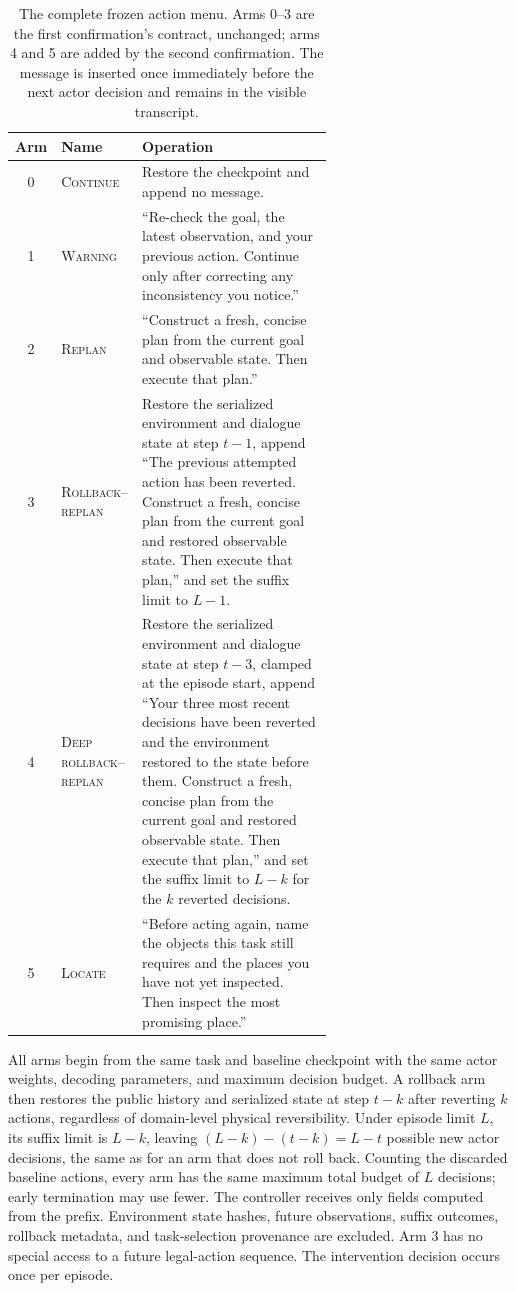 \begin{table}[ht]
\caption{The complete frozen action menu. Arms 0--3 are the first confirmation's contract, unchanged; arms 4 and 5 are added by the second confirmation. The message is inserted once immediately before the next actor decision and remains in the visible transcript.}
\label{tab:messages}
\centering
\small
\begin{tabular}{@{}clp{0.63\linewidth}@{}}
\toprule
Arm & Name & Operation \\
\midrule
0 & \textsc{Continue} & Restore the checkpoint and append no message. \\
1 & \textsc{Warning} & ``Re-check the goal, the latest observation, and your previous action. Continue only after correcting any inconsistency you notice.'' \\
2 & \textsc{Replan} & ``Construct a fresh, concise plan from the current goal and observable state. Then execute that plan.'' \\
3 & \textsc{Rollback--replan} & Restore the serialized environment and dialogue state at step $t-1$, append ``The previous attempted action has been reverted. Construct a fresh, concise plan from the current goal and restored observable state. Then execute that plan,'' and set the suffix limit to $L-1$. \\
4 & \textsc{Deep rollback--replan} & Restore the serialized environment and dialogue state at step $t-3$, clamped at the episode start, append ``Your three most recent decisions have been reverted and the environment restored to the state before them. Construct a fresh, concise plan from the current goal and restored observable state. Then execute that plan,'' and set the suffix limit to $L-k$ for the $k$ reverted decisions. \\
5 & \textsc{Locate} & ``Before acting again, name the objects this task still requires and the places you have not yet inspected. Then inspect the most promising place.'' \\
\bottomrule
\end{tabular}
\end{table}

All arms begin from the same task and baseline checkpoint with the same actor weights, decoding parameters, and maximum decision budget. A rollback arm then restores the public history and serialized state at step $t-k$ after reverting $k$ actions, regardless of domain-level physical reversibility. Under episode limit $L$, its suffix limit is $L-k$, leaving $(L-k)-(t-k)=L-t$ possible new actor decisions, the same as for an arm that does not roll back. Counting the discarded baseline actions, every arm has the same maximum total budget of $L$ decisions; early termination may use fewer. The controller receives only fields computed from the prefix. Environment state hashes, future observations, suffix outcomes, rollback metadata, and task-selection provenance are excluded. Arm 3 has no special access to a future legal-action sequence. The intervention decision occurs once per episode.

